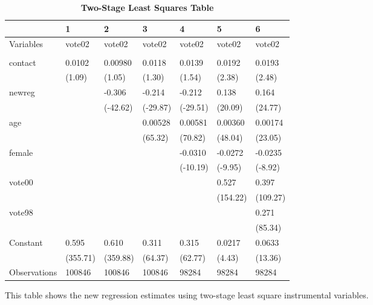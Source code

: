 \documentclass[a4paper]{article}
\begin{document}
\begin{table}[h!]
\caption{\textbf{Two-Stage Least Squares Table}}
\begin{tabular}{|l|l|l|l|l|l|l|}
\hline
             & 1        & 2         & 3          & 4          & 5          & 6          \\ \hline
Variables    & vote02   & vote02    & vote02     & vote02     & vote02     & vote02     \\ \hline
             &          &           &            &            &            &            \\ \hline
contact      & 0.0102   & 0.00980   & 0.0118     & 0.0139     & 0.0192    & 0.0193    \\ \hline
             & (1.09)   & (1.05)    & (1.30)     & (1.54)     & (2.38)     & (2.48)     \\ \hline
newreg       &          & -0.306 & -0.214  & -0.212  & 0.138   & 0.164  \\ \hline
             &          & (-42.62)  & (-29.87)   & (-29.51)   & (20.09)    & (24.77)    \\ \hline
age          &          &           & 0.00528 & 0.00581 & 0.00360 & 0.00174 \\ \hline
             &          &           & (65.32)    & (70.82)    & (48.04)    & (23.05)    \\ \hline
female       &          &           &            & -0.0310 & -0.0272 & -0.0235 \\ \hline
             &          &           &            & (-10.19)   & (-9.95)    & (-8.92)    \\ \hline
vote00       &          &           &            &            & 0.527   & 0.397   \\ \hline
             &          &           &            &            & (154.22)   & (109.27)   \\ \hline
vote98       &          &           &            &            &            & 0.271   \\ \hline
             &          &           &            &            &            & (85.34)    \\ \hline
Constant     & 0.595 & 0.610  & 0.311   & 0.315   & 0.0217  & 0.0633  \\ \hline
             & (355.71) & (359.88)  & (64.37)    & (62.77)    & (4.43)     & (13.36)    \\ \hline
Observations & 100846   & 100846    & 100846     & 98284      & 98284      & 98284      \\ \hline
\end{tabular}
\RaggedRight This table shows the new regression estimates using two-stage least square instrumental variables. 
\end{table}
\end{document}
